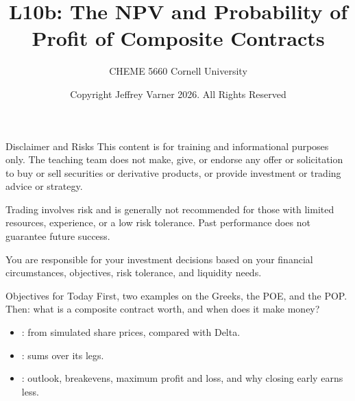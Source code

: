 \documentclass[aspectratio=169,11pt]{beamer}
\title{\texorpdfstring{{\vnheavy L10b}}{L10b}: The NPV and Probability of Profit of Composite Contracts}
\subtitle{CHEME 5660 Cornell University}
\author{Copyright Jeffrey Varner 2026. All Rights Reserved}
\begin{document}
\vntitlepage

\begin{frame}{Disclaimer and Risks}
  \vspace{0.6em}
  \textbf{} This content is for training and informational
  purposes only. The teaching team does not make, give, or endorse any offer or
  solicitation to buy or sell securities or derivative products, or provide
  investment or trading advice or strategy.

  \vspace{1.1em}
  \textbf{} Trading involves risk and is generally not recommended for
  those with limited resources, experience, or a low risk tolerance. Past
  performance does not guarantee future success.

  \vspace{1.1em}
  \textbf{} You are responsible for your investment decisions
  based on your financial circumstances, objectives, risk tolerance, and
  liquidity needs.
\end{frame}

\begin{frame}{Objectives for Today}
  First, two examples on the Greeks, the POE, and the POP. Then: what is a
  composite contract worth, and when does it make money?

  \vspace{0.5em}
  {\large\textbf{}}
  \begin{itemize}\setlength{\itemsep}{0.4em}
    \item {}: from simulated share
      prices, compared with Delta.
    \item {}: sums over its legs.
    \item {}: outlook, breakevens, maximum profit
      and loss, and why closing early earns less.
  \end{itemize}
\end{frame}
\end{document}
